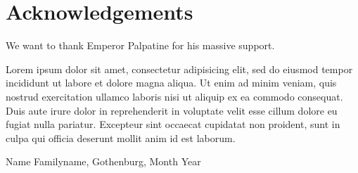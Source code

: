 \thispagestyle{plain}			%
\section*{Acknowledgements}


We want to thank Emperor Palpatine for his massive support.

Lorem ipsum dolor sit amet, consectetur adipisicing elit, sed do eiusmod tempor incididunt ut labore et dolore magna aliqua. Ut enim ad minim veniam, quis nostrud exercitation ullamco laboris nisi ut aliquip ex ea commodo consequat. Duis aute irure dolor in reprehenderit in voluptate velit esse cillum dolore eu fugiat nulla pariatur. Excepteur sint occaecat cupidatat non proident, sunt in culpa qui officia deserunt mollit anim id est laborum.

\vspace{1.5cm}
\hfill
Name Familyname, Gothenburg, Month Year

\newpage				%
\thispagestyle{empty}
\mbox{}